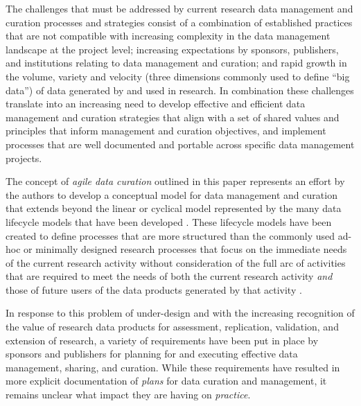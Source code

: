 \documentclass[paper]{ijdc-v9}
\begin{document}
The challenges that must be addressed by current research data
management and curation processes and strategies consist of a
combination of established practices that are not compatible with
increasing complexity in the data management landscape at the project
level; increasing expectations by sponsors, publishers, and institutions
relating to data management and curation; and rapid growth in the
volume, variety and velocity (three dimensions commonly used to define
``big data'') of data generated by and used in research. In combination
these challenges translate into an increasing need to develop effective
and efficient data management and curation strategies that align with a
set of shared values and principles that inform management and curation
objectives, and implement processes that are well documented and
portable across specific data management projects.

The concept of \emph{agile data curation} outlined in this paper
represents an effort by the authors to develop a conceptual model for
data management and curation that extends beyond the linear or cyclical
model represented by the many data lifecycle models that have been
developed
\autocites{ball_review_2012}{park_session_2016}{moller_lifecycle_2013}{working_group_on_information_systems_and_services_data_data_stewardship_interest_group_data_2011}.
These lifecycle models have been created to define processes that are
more structured than the commonly used ad-hoc or minimally designed
research processes that focus on the immediate needs of the current
research activity without consideration of the full arc of activities
that are required to meet the needs of both the current research
activity \emph{and} those of future users of the data products generated
by that activity
\autocites{kervin_common_2013}{white_considering_2010}{tenopir_data_2011}{akers_disciplinary_2013}{kennan_research_2015}{vines_availability_2014}.

In response to this problem of under-design and with the increasing
recognition of the value of research data products for assessment,
replication, validation, and extension of research, a variety of
requirements have been put in place by sponsors
\autocites{office_of_management_and_budget_omb_digital_2012}{office_of_management_and_budget_omb_memorandum_2013}{office_of_management_and_budget_omb_memorandum_2009}{obama_77_2012}{obama_executive_2013}{obama_transparency_2009}
and publishers \autocites{_availability_2016}[
]{public_library_of_science_plos_data_2016} for planning for and
executing effective data management, sharing, and curation. While these
requirements have resulted in more explicit documentation of
\emph{plans} for data curation and management, it remains unclear what
impact they are having on \emph{practice}.
\end{document}
